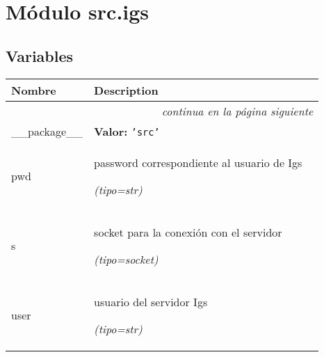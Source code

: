 %
%
%


\section{Módulo src.igs}

    \label{src:igs}


  \subsection{Variables}

    \vspace{-1cm}
\hspace{\varindent}\begin{longtable}{|p{\varnamewidth}|p{\vardescrwidth}|l}
\cline{1-2}
\cline{1-2} \centering \textbf{Nombre} & \centering \textbf{Description}& \\
\cline{1-2}
\endhead\cline{1-2}\multicolumn{3}{r}{\small\textit{continua en la página siguiente}}\\\endfoot\cline{1-2}
\endlastfoot\raggedright \_\-\_\-p\-a\-c\-k\-a\-g\-e\-\_\-\_\- & \raggedright \textbf{Valor:} 
{\tt \texttt{'}\texttt{src}\texttt{'}}&\\
\cline{1-2}
\raggedright p\-w\-d\- & \raggedright password correspondiente al usuario de Igs

            {\it (tipo=str)}&\\
\cline{1-2}
\raggedright s\- & \raggedright socket para la conexión con el servidor

            {\it (tipo=socket)}&\\
\cline{1-2}
\raggedright u\-s\-e\-r\- & \raggedright usuario del servidor Igs

            {\it (tipo=str)}&\\
\cline{1-2}
\end{longtable}


